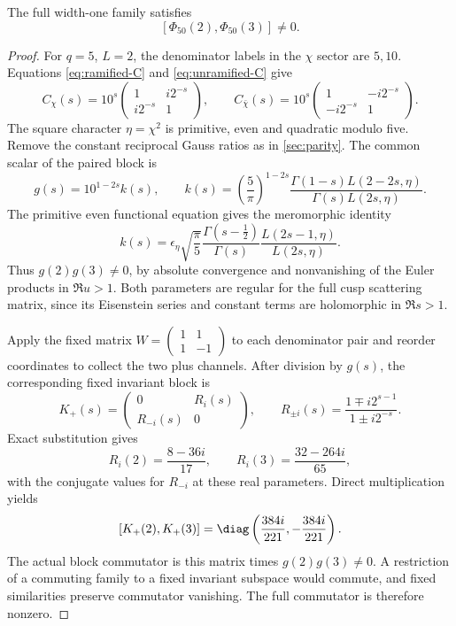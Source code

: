 \begin{proposition}\label{prop:50}
The full width-one family satisfies
\[
 [\Phi_{50}(2),\Phi_{50}(3)]\ne0.
\]
\end{proposition}
\begin{proof}
For \(q=5\), \(L=2\), the denominator labels in the \(\chi\)
sector are \(5,10\). Equations
\eqref{eq:ramified-C} and \eqref{eq:unramified-C} give
\[
 C_\chi(s)=10^s
 \begin{pmatrix}1&i2^{-s}\\i2^{-s}&1\end{pmatrix},
 \qquad
 C_{\bar\chi}(s)=10^s
 \begin{pmatrix}1&-i2^{-s}\\-i2^{-s}&1\end{pmatrix}.
\]
The square character \(\eta=\chi^2\) is primitive, even and
quadratic modulo five. Remove the constant reciprocal Gauss
ratios as in \cref{sec:parity}. The common scalar of the paired
block is
\[
 g(s)=10^{1-2s}k(s),\qquad
 k(s)=\left(\frac5\pi\right)^{1-2s}
 \frac{\Gamma(1-s)L(2-2s,\eta)}{\Gamma(s)L(2s,\eta)}.
\]
The primitive even functional equation gives the meromorphic
identity
\[
 k(s)=\epsilon_\eta\sqrt{\frac\pi5}
       \frac{\Gamma(s-\tfrac12)}{\Gamma(s)}
       \frac{L(2s-1,\eta)}{L(2s,\eta)}.
\]
Thus \(g(2)g(3)\ne0\), by absolute convergence and nonvanishing
of the Euler products in \(\Re u>1\). Both parameters are
regular for the full cusp scattering matrix, since its
Eisenstein series and constant terms are holomorphic in
\(\Re s>1\).

Apply the fixed matrix
\(W=\left(\begin{smallmatrix}1&1\\1&-1\end{smallmatrix}\right)\)
to each denominator pair and reorder coordinates to collect
the two plus channels. After division by \(g(s)\), the
corresponding fixed invariant block is
\[
 K_+(s)=\begin{pmatrix}0&R_i(s)\\R_{-i}(s)&0\end{pmatrix},
 \qquad
 R_{\pm i}(s)=\frac{1\mp i2^{s-1}}{1\pm i2^{-s}}.
\]
Exact substitution gives
\[
 R_i(2)=\frac{8-36i}{17},\qquad
 R_i(3)=\frac{32-264i}{65},
\]
with the conjugate values for \(R_{-i}\) at these real
parameters. Direct multiplication yields
\[
 [K_+(2),K_+(3)]
 =\diag\left(\frac{384i}{221},-\frac{384i}{221}\right).
\]
The actual block commutator is this matrix times
\(g(2)g(3)\ne0\). A restriction of a commuting family to a
fixed invariant subspace would commute, and fixed similarities
preserve commutator vanishing. The full commutator is
therefore nonzero.
\end{proof}

